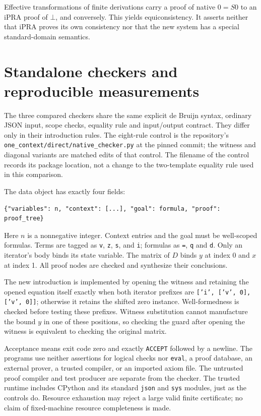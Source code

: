 \documentclass[11pt]{article}
\theoremstyle{definition}
\theoremstyle{remark}
\begin{document}
Effective transformations of finite derivations carry a proof of native
\(0=S0\) to an iPRA proof of \(\bot\), and conversely. This yields
equiconsistency. It asserts neither that iPRA proves its own consistency
nor that the new system has a special standard-domain semantics.

\section{Standalone checkers and reproducible measurements}
\label{sec:implementation}

The three compared checkers share the same explicit de Bruijn syntax,
ordinary JSON input, scope checks, equality rule and input/output contract.
They differ only in their introduction rules. The eight-rule control is
the repository's \texttt{one\_context/direct/native\_checker.py} at the
pinned commit; the witness and diagonal variants are matched edits of that
control. The filename of the control records its package location, not a
change to the two-template equality rule used in this comparison.

The data object has exactly four fields:
\begin{lstlisting}
{"variables": n, "context": [...], "goal": formula, "proof": proof_tree}
\end{lstlisting}
Here \(n\) is a nonnegative integer. Context entries and the goal must be
well-scoped formulas. Terms are tagged as \texttt{v}, \texttt{z},
\texttt{s}, and \texttt{i}; formulas as \texttt{=}, \texttt{q} and
\texttt{d}. Only an iterator's body binds its state variable.
The matrix of \(D\) binds \(y\) at index 0 and \(x\) at index 1.
All proof nodes are checked and synthesize their conclusions.

The new introduction is implemented by opening the witness and retaining
the opened equation itself exactly when both iterator prefixes are
\texttt{['i', ['v', 0], ['v', 0]]}; otherwise it retains the shifted
zero instance. Well-formedness is checked before testing these prefixes.
Witness substitution cannot manufacture the bound \(y\) in one of these
positions, so checking the guard after opening the witness is equivalent
to checking the original matrix.

Acceptance means exit code zero and exactly \texttt{ACCEPT} followed by a
newline. The programs use neither assertions for logical checks nor
\texttt{eval}, a proof database, an external prover, a trusted compiler,
or an imported axiom file. The untrusted proof compiler and test producer
are separate from the checker. The trusted runtime includes CPython and
its standard \texttt{json} and \texttt{sys} modules, just as the controls
do. Resource exhaustion may reject a large valid finite certificate;
no claim of fixed-machine resource completeness is made.
\end{document}
